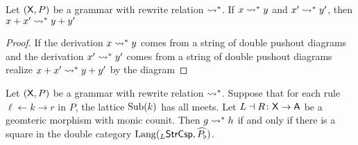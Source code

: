 \documentclass{amsart}
\begin{document}
\begin{lemma} \label{thm:rewrite-rel-is-additive}
  Let $( \mathsf{X},P )$ be a grammar with rewrite relation $\rightsquigarrow^\ast$.
  If $ x \rightsquigarrow^\ast y $ and $ x' \rightsquigarrow^\ast y' $, then
  $ x+x' \rightsquigarrow^\ast y+y' $
\end{lemma}

\begin{proof}
  If the derivation $ x \rightsquigarrow^\ast y $ comes from a string of
  double pushout diagrams
   and the derivation
  $ x' \rightsquigarrow^\ast y' $ comes from a string of double pushout
  diagrams  realize
  $ x+x' \rightsquigarrow^\ast y+y' $ by the diagram
  
\end{proof}

\begin{theorem} \label{thm:inductive-rewriting} Let
  $ ( \mathsf{X} , P ) $ be a grammar with rewrite relation
  $\rightsquigarrow^\ast$. Suppose that for each rule
  $\ell \gets k \to r$ in $P$, the lattice $ \operatorname{Sub} (k) $ has
  all meets.  Let $ L \dashv R \colon \mathsf{X} \to \mathsf{A} $ be a
  geomteric morphism with monic counit. Then
  $ g \rightsquigarrow^\ast h $ if and only if there is a square
   in the double
  category $ \mathrm{Lang} ( _{L}\mathsf{StrCsp} , \widehat{P_\flat} ) $.
\end{theorem}
\end{document}
